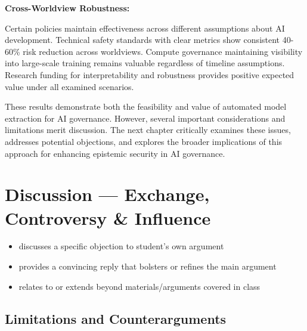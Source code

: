 \documentclass[
  11pt,
  letterpaper,
]{book}
\providecommand{\tightlist}{%
  \setlength{\itemsep}{0pt}\setlength{\parskip}{0pt}}
\begin{document}
\textbf{Cross-Worldview Robustness:}

Certain policies maintain effectiveness across different assumptions
about AI development. Technical safety standards with clear metrics show
consistent 40-60\% risk reduction across worldviews. Compute governance
maintaining visibility into large-scale training remains valuable
regardless of timeline assumptions. Research funding for
interpretability and robustness provides positive expected value under
all examined scenarios.

These results demonstrate both the feasibility and value of automated
model extraction for AI governance. However, several important
considerations and limitations merit discussion. The next chapter
critically examines these issues, addresses potential objections, and
explores the broader implications of this approach for enhancing
epistemic security in AI governance.


\chapter{Discussion --- Exchange, Controversy \&
Influence}\label{sec-discussion}

\begin{tcolorbox}[enhanced jigsaw, bottomrule=.15mm, title=\textcolor{quarto-callout-note-color}{\faInfo}\hspace{0.5em}{10\% of Grade: \textasciitilde{} 14\% of text \textasciitilde{} 4200
words \textasciitilde{} 10 pages}, opacityback=0, arc=.35mm, breakable, toptitle=1mm, toprule=.15mm, colframe=quarto-callout-note-color-frame, bottomtitle=1mm, rightrule=.15mm, opacitybacktitle=0.6, left=2mm, titlerule=0mm, leftrule=.75mm, colback=white, colbacktitle=quarto-callout-note-color!10!white, coltitle=black]

\begin{itemize}
\tightlist
\item
  discusses a specific objection to student's own argument
\item
  provides a convincing reply that bolsters or refines the main argument
\item
  relates to or extends beyond materials/arguments covered in class
\end{itemize}

\end{tcolorbox}

\section{Limitations and
Counterarguments}\label{sec-limitations-counterarguments}
\end{document}
